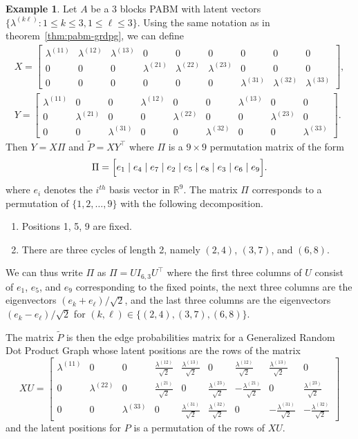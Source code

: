 \documentclass[
  12pt,
]{article}
\theoremstyle{definition}
\theoremstyle{definition}
\newtheorem{example}{Example}[section]
\theoremstyle{definition}
\theoremstyle{definition}
\theoremstyle{remark}
\begin{document}
\begin{example} Let $A$ be a $3$ blocks PABM with latent vectors $\{\lambda^{(k \ell)} \colon 1 \leq k \leq 3, 1 \leq \ell \leq 3\}$. 
Using the same notation as in theorem~\ref{thm:pabm-grdpg}, we can define
\begin{gather*}
X = \begin{bmatrix}
\lambda^{(11)} & \lambda^{(12)} & \lambda^{(13)} & 0 & 0 & 0 & 0 & 0 & 0 \\
0 & 0 & 0 & \lambda^{(21)} & \lambda^{(22)} & \lambda^{(23)} & 0 & 0 & 0 \\
0 & 0 & 0 & 0 & 0 & 0 & \lambda^{(31)} & \lambda^{(32)} & \lambda^{(33)}
\end{bmatrix}, \\
Y = \begin{bmatrix}
\lambda^{(11)} & 0 & 0 & \lambda^{(12)} & 0 & 0 & \lambda^{(13)} & 0 & 0 \\
0 & \lambda^{(21)} & 0 & 0 & \lambda^{(22)} & 0 & 0 & \lambda^{(23)} & 0 \\
0 & 0 & \lambda^{(31)} & 0 & 0 & \lambda^{(32)} & 0 & 0 & \lambda^{(33)}
\end{bmatrix}.
\end{gather*}
Then $Y = X \Pi$ and $\tilde{P} = X Y^{\top}$ where $\Pi$ is a $9 \times 9$ 
permutation matrix of the form
$$\Pi = 
\Bigl[e_1 \mid e_4 \mid e_7 \mid e_2 \mid e_5 \mid e_8 \mid e_3
\mid e_6 \mid e_9 \Bigr].$$
where $e_i$ denotes the $i^{th}$ basis vector in $\mathbb{R}^{9}$. 
The matrix $\Pi$ corresponds to a permutation of $\{1,2,\dots,9\}$ with the following decomposition.
\begin{enumerate}
\item Positions 1, 5, 9 are fixed.
\item There are three cycles of length 2, namely $(2, 4)$, $(3, 7)$, and $(6, 8)$.
\end{enumerate}
We can thus write $\Pi$ as $\Pi = U I_{6, 3} U^\top$ where the first three columns of $U$ consist of $e_1$, $e_5$, and $e_9$ corresponding to the fixed points, the next three columns are the eigenvectors $(e_k + e_{\ell}) / \sqrt{2}$, and the last three columns are the eigenvectors $(e_k - e_{\ell}) / \sqrt{2}$ for $(k, \ell) \in \{(2,4),(3,7),(6,8)\}$.

The matrix $\tilde{P}$ is then the edge probabilities matrix for a 
Generalized Random Dot Product Graph whose latent positions 
are the rows of the matrix
$$XU = \begin{bmatrix}
\lambda^{(11)} & 0 & 0 &
\frac{\lambda^{(12)}}{\sqrt{2}} & \frac{\lambda^{(13)}}{\sqrt{2}} & 0 &
\frac{\lambda^{(12)}}{\sqrt{2}} & \frac{\lambda^{(13)}}{\sqrt{2}} & 0 \\
0 & \lambda^{(22)} & 0 &
\frac{\lambda^{(21)}}{\sqrt{2}} & 0 & \frac{\lambda^{(23)}}{\sqrt{2}} &
-\frac{\lambda^{(21)}}{\sqrt{2}} & 0 & \frac{\lambda^{(23)}}{\sqrt{2}} \\
0 & 0 & \lambda^{(33)} &
0 & \frac{\lambda^{(31)}}{\sqrt{2}} & \frac{\lambda^{(32)}}{\sqrt{2}} &
0 & -\frac{\lambda^{(31)}}{\sqrt{2}} & -\frac{\lambda^{(32)}}{\sqrt{2}}
\end{bmatrix}$$
and the latent positions for $P$ is a permutation of the rows of
$XU$. 
\end{example}
\end{document}
